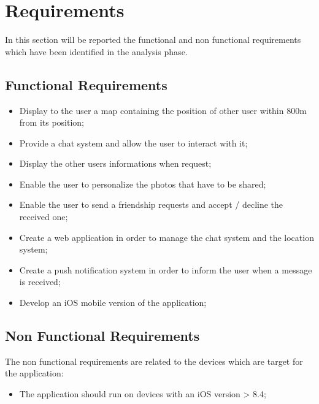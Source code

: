 \section{Requirements}
In this section will be reported the functional and non functional requirements which have been identified in the analysis phase.
\subsection{Functional Requirements}
\begin{itemize}
\item Display to the user a map containing the position of other user within 800m from its position;
\item Provide a chat system and allow the user to interact with it;
\item Display the other users informations when request;
\item Enable the user to personalize the photos that have to be shared;
\item Enable the user to send a friendship requests and accept / decline the received one;
\item Create a web application in order to manage the chat system and the location system;
\item Create a push notification system in order to inform the user when a message is received;
\item Develop an iOS mobile version of the application;
\end{itemize} 


\subsection{Non Functional Requirements}
The non functional requirements are related to the devices which are target for the application:
\begin{itemize}
\item The application should run on devices with an iOS version > 8.4;
\end{itemize}